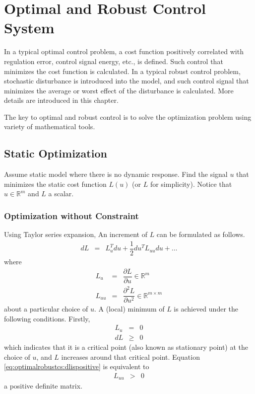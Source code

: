 \chapter{Optimal and Robust Control System} \label{ch:optimalrobustcs}

In a typical optimal control problem, a cost function positively correlated with regulation error, control signal energy, etc., is defined. Such control that minimizes the cost function is calculated. In a typical robust control problem, stochastic disturbance is introduced into the model, and such control signal that minimizes the average or worst effect of the disturbance is calculated. More details are introduced in this chapter.

The key to optimal and robust control is to solve the optimization problem using variety of mathematical tools.

\section{Static Optimization} \label{sec:optimalrobustcs:static}

Assume static model where there is no dynamic response. Find the signal $u$ that minimizes the static cost function $L(u)$ (or $L$ for simplicity). Notice that $u\in\mathbb{R}^m$ and $L$ a scalar.

\subsection{Optimization without Constraint}

Using Taylor series expansion, An increment of $L$ can be formulated as follows.
\begin{eqnarray}
	dL &=& L_u^Tdu + \dfrac{1}{2}du^TL_{uu}du + \ldots \nonumber
\end{eqnarray}
where
\begin{eqnarray}
	L_u &=& \dfrac{\partial L}{\partial u} \in \mathbb{R}^m \nonumber \\
	L_{uu} &=& \dfrac{\partial^2 L}{\partial u^2} \in \mathbb{R}^{m\times m}
\end{eqnarray}
about a particular choice of $u$. A (local) minimum of $L$ is achieved under the following conditions. Firstly,
\begin{eqnarray}
	L_u &=& 0 \nonumber \\
	dL &\geq& 0 \label{eq:optimalrobustcs:dlispositive}
\end{eqnarray}
which indicates that it is a critical point (also known as stationary point) at the choice of $u$, and $L$ increases around that critical point. Equation \eqref{eq:optimalrobustcs:dlispositive} is equivalent to
\begin{eqnarray}
	L_{uu} &>& 0 \nonumber
\end{eqnarray}
a positive definite matrix.


